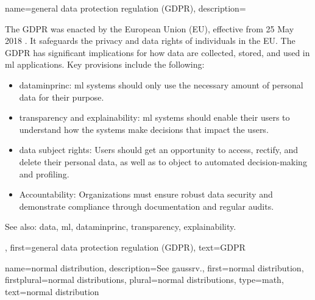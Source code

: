 {name={general data protection regulation (GDPR)},
	description={The GDPR
			was enacted by the European Union (EU), effective from 25 May 2018 \cite{GDPR2016}. 
			It safeguards the privacy and \gls{data} rights of individuals in the EU. 
			The GDPR has significant implications for how \gls{data} are collected, stored, and used in \gls{ml}  
			applications. Key provisions include the following:
			\begin{itemize}
				\item \Gls{dataminprinc}: \gls{ml} systems should only use the necessary amount of personal 
				\gls{data} for their purpose.
				\item \Gls{transparency} and \gls{explainability}: \gls{ml} systems should enable their users to 
				understand how the systems make decisions that impact the users.
				\item \Gls{data} subject rights: Users should get an opportunity to access, rectify, and delete their personal \gls{data}, as well as to object to automated decision-making and profiling.
				\item Accountability: Organizations must ensure robust \gls{data} security and demonstrate 
				compliance through documentation and regular audits.
			\end{itemize}
		See also: \gls{data}, \gls{ml}, \gls{dataminprinc}, \gls{transparency}, \gls{explainability}.}, 
	first={general data protection regulation (GDPR)},
	text={GDPR}
}

{name={normal distribution}, 
 description={See \gls{gaussrv}.},
 first={normal distribution}, 
 firstplural={normal distributions},
 plural={normal distributions},
 type=math, 
 text={normal distribution}
}
	
